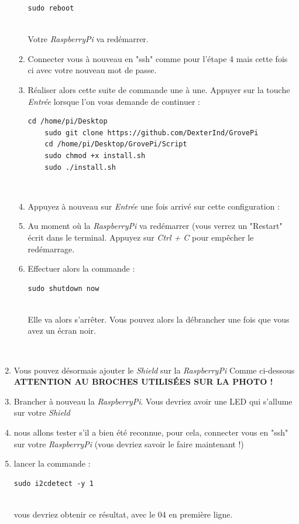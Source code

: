 \begin{enumerate}
\begin{enumerate}
\begin{lstlisting}[style=MyBashStyle]
	sudo reboot
	\end{lstlisting}\\
	Votre \textit{RaspberryPi} va redémarrer.
	\item Connecter vous à nouveau en "ssh" comme pour l'étape 4 mais cette fois ci avec votre nouveau mot de passe.
	\item Réaliser alors cette suite de commande une à une. Appuyer sur la touche \textit{Entrée} lorsque l'on vous demande de continuer :
	\begin{lstlisting}[style=MyBashStyle]
	cd /home/pi/Desktop
	sudo git clone https://github.com/DexterInd/GrovePi
	cd /home/pi/Desktop/GrovePi/Script
	sudo chmod +x install.sh
	sudo ./install.sh
	\end{lstlisting}\\
	
	\item Appuyez à nouveau sur \textit{Entrée} une fois arrivé sur cette configuration :
	\item Au moment où la \textit{RaspberryPi} va redémarrer (vous verrez un "Restart" écrit dans le terminal. Appuyez sur \textit{Ctrl + C} pour empêcher le redémarrage.
	\item Effectuer alors la commande :
	\begin{lstlisting}[style=MyBashStyle]
	sudo shutdown now
	\end{lstlisting}\\
	Elle va alors s'arrêter. Vous pouvez alors la débrancher une fois que vous avez un écran noir.
	\end{enumerate}\\
	
		\item Vous pouvez désormais ajouter le \textit{Shield} sur la \textit{RaspberryPi} Comme ci-dessous \textbf{ATTENTION AU BROCHES UTILISÉES SUR LA PHOTO !}\\
		\item Brancher à nouveau la \textit{RaspberryPi}. Vous devriez avoir une LED qui s'allume sur votre \textit{Shield}
		\item nous allons tester s'il a bien été reconnue, pour cela, connecter vous en "ssh" sur votre \textit{RaspberryPi} (vous devriez savoir le faire maintenant !)
		\item lancer la commande :
		\begin{lstlisting}[style=MyBashStyle]
		sudo i2cdetect -y 1
		\end{lstlisting}\\
	
vous devriez obtenir ce résultat, avec le 04 en première ligne. %

\end{enumerate}\\

